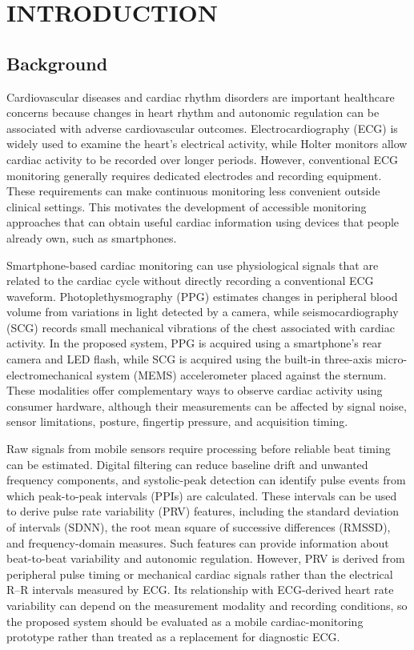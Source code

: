 \chapter{INTRODUCTION}

\section{Background}

Cardiovascular diseases and cardiac rhythm disorders are important healthcare concerns because changes in heart rhythm and autonomic regulation can be associated with adverse cardiovascular outcomes. Electrocardiography (ECG) is widely used to examine the heart's electrical activity, while Holter monitors allow cardiac activity to be recorded over longer periods. However, conventional ECG monitoring generally requires dedicated electrodes and recording equipment. These requirements can make continuous monitoring less convenient outside clinical settings. This motivates the development of accessible monitoring approaches that can obtain useful cardiac information using devices that people already own, such as smartphones.

Smartphone-based cardiac monitoring can use physiological signals that are related to the cardiac cycle without directly recording a conventional ECG waveform. Photoplethysmography (PPG) estimates changes in peripheral blood volume from variations in light detected by a camera, while seismocardiography (SCG) records small mechanical vibrations of the chest associated with cardiac activity. In the proposed system, PPG is acquired using a smartphone's rear camera and LED flash, while SCG is acquired using the built-in three-axis micro-electromechanical system (MEMS) accelerometer placed against the sternum. These modalities offer complementary ways to observe cardiac activity using consumer hardware, although their measurements can be affected by signal noise, sensor limitations, posture, fingertip pressure, and acquisition timing.

Raw signals from mobile sensors require processing before reliable beat timing can be estimated. Digital filtering can reduce baseline drift and unwanted frequency components, and systolic-peak detection can identify pulse events from which peak-to-peak intervals (PPIs) are calculated. These intervals can be used to derive pulse rate variability (PRV) features, including the standard deviation of intervals (SDNN), the root mean square of successive differences (RMSSD), and frequency-domain measures. Such features can provide information about beat-to-beat variability and autonomic regulation. However, PRV is derived from peripheral pulse timing or mechanical cardiac signals rather than the electrical R--R intervals measured by ECG. Its relationship with ECG-derived heart rate variability can depend on the measurement modality and recording conditions, so the proposed system should be evaluated as a mobile cardiac-monitoring prototype rather than treated as a replacement for diagnostic ECG.

